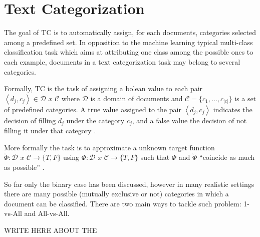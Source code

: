
\section{Text Categorization}
\label{sec:rel_text_categorization}

The goal of \ac{TC} is to automatically assign, for each
documents, categories selected among a predefined set.
In opposition to the machine learning typical multi-class classification
task which aims at attributing one class among the possible ones to each
example, documents in a text categorization task may belong to several
categories. 

Formally,  \ac{TC} is the  task of  assigning a bolean value to each pair 
$\left\langle d_{j},c_{j}\right\rangle \in\mathcal{D}\,\, x\,\mathcal{\, C}$
where  $\mathcal{D}$  is a domain of documents and
$\mathcal{C}=\{c_{1},\ldots,c_{|c|}\}$ is a set of predefined categories. A
true value assigned to the pair $\left\langle d_{j},c_{j}\right\rangle $
indicates the decision of filling  $d_{j}$ under the category  $c_{j}$, and
a false value the decision of not filling it under that category \cite{Sebastiani02}. 

More formally the task is to approximate a unknown target function 
 $\breve{\Phi}:\mathcal{D}\,\, x\,\mathcal{\, C}\rightarrow\{T,F\}$  using 
 $\Phi:\mathcal{D}\,\, x\,\mathcal{\, C}\rightarrow\{T,F\}$  such that 
 $\Phi$ and  $\breve{\Phi}$ ``coincide as much as possible'' \cite{Sebastiani02}. 

So far only the binary case has been discussed, however in many realistic
settings there are many possible (mutually exclusive or not) categories in
which a document can be classified.  There are two main ways to  tackle
such problem: 1-vs-All and All-vs-All. 

WRITE HERE ABOUT THE

